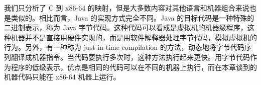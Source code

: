 我们只分析了 C 到 x86-64 的映射，但是大多数内容对其他语言和机器组合来说也是类似的。相比而言，Java 的实现方式完全不同。Java 的目标代码是一种特殊的二进制表示，称为 Java 字节代码。这种代码可以看成是虚拟机的机器级程序，这种机器并不是直接用硬件实现的，而是用软件解释器处理字节代码，模拟虚拟机的行为。另外，有一种称为 just-in-time compilation 的方法，动态地将字节代码序列翻译成机器指令。当代码要执行多次时，这种方法执行起来更快。用字节代码作为程序的低级表示，优点是相同的代码可以在不同的机器上执行，而在本章谈到的机器代码只能在 x86-64 机器上运行。
\endinput
